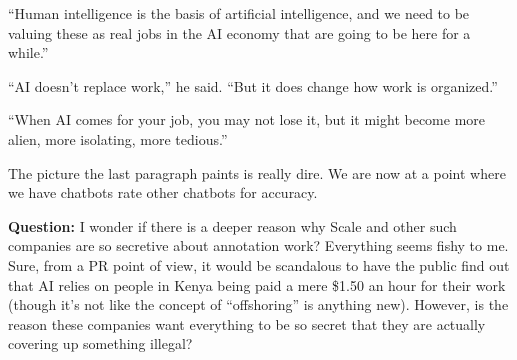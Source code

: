 ``Human intelligence is the basis of artificial intelligence, and we need to be valuing these as real jobs in the AI economy that are going to be here for a while.''

``AI doesn’t replace work,'' he said. ``But it does change how work is organized.''

``When AI comes for your job, you may not lose it, but it might become more alien, more isolating, more tedious.''


The picture the last paragraph paints is really dire.
We are now at a point where we have chatbots rate other chatbots for accuracy.

\textbf{Question:}
I wonder if there is a deeper reason why Scale and other such companies are so secretive about annotation work?
Everything seems fishy to me.
Sure, from a PR point of view, it would be scandalous to have the public find out that AI relies on people in Kenya being paid a mere \$1.50 an hour for their work (though it's not like the concept of ``offshoring'' is anything new).
However, is the reason these companies want everything to be so secret that they are actually covering up something illegal?